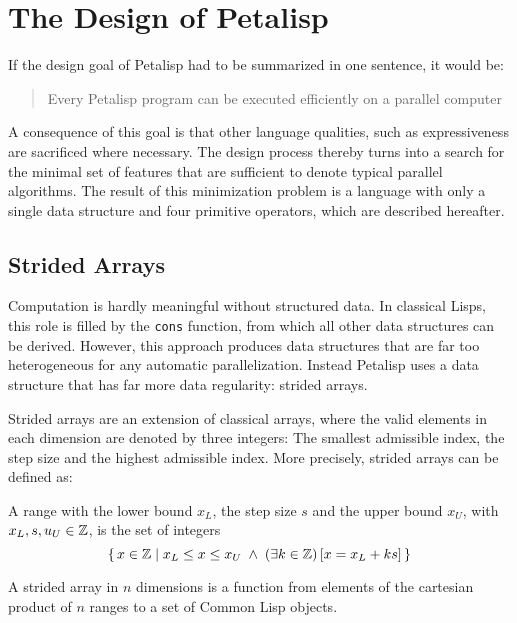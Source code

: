 \section{The Design of Petalisp}
\label{sec:design}

If the design goal of Petalisp had to be summarized in one sentence, it
would be:

\begin{quotation}
  Every Petalisp program can be executed efficiently on a parallel
  computer
\end{quotation}

\noindent A consequence of this goal is that other language qualities, such
as expressiveness are sacrificed where necessary. The design process
thereby turns into a search for the minimal set of features that are
sufficient to denote typical parallel algorithms. The result of this
minimization problem is a language with only a single data structure and
four primitive operators, which are described hereafter.

\subsection{Strided Arrays}

Computation is hardly meaningful without structured data. In classical
Lisps, this role is filled by the \texttt{cons} function, from which all
other data structures can be derived. However, this approach produces data
structures that are far too heterogeneous for any automatic
parallelization. Instead Petalisp uses a data structure that has far more
data regularity: strided arrays.

Strided arrays are an extension of classical arrays, where the valid
elements in each dimension are denoted by three integers: The smallest
admissible index, the step size and the highest admissible index. More
precisely, strided arrays can be defined as:

\begin{define}[range]
  A range with the lower bound $x_L$, the step size $s$ and the upper bound
  $x_U$, with $x_L, s, u_U \in \mathbb{Z}$, is the set of integers
  $$\{\, x \in \mathbb{Z} \;|\; x_{L} \le x \le x_{U} \;\wedge\; (\exists k \in \mathbb{Z})\,[ x = x_{L} + k s]\,\}$$
\end{define}

\begin{define}
  A strided array in $n$ dimensions is a function from elements of the
  cartesian product of $n$ ranges to a set of Common Lisp objects.
\end{define}

